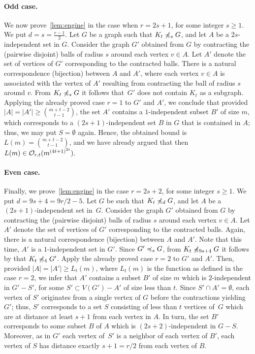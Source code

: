 \paragraph{Odd case.}
We now prove~\cref{lem:engine} in the case when $r=2s+1$, for some integer $s\geq 1$. We put $d=s=\frac{r-1}{2}$.
Let $G$ be a graph such that $K_t\not\preccurlyeq_s G$, and 
 let $A$ be a $2s$-independent set in $G$. Consider the graph $G'$ obtained from $G$
by contracting the (pairwise disjoint) balls of radius $s$ around each vertex $v\in A$.
 Let $A'$ denote the set of vertices of $G'$ corresponding to the contracted balls. There is a natural correspondence (bijection) between $A$ and $A'$, where each vertex $v\in A$ is associated with the
 vertex of $A'$ resulting from contracting the ball of radius $s$ around $v$.
From $K_t\not\preccurlyeq_s G$ it follows that~$G'$ does not contain $K_t$ as a subgraph. Applying the already proved case $r=1$ to $G'$ and $A'$, we conclude that 
provided $|A|=|A'|\ge {m+t-2\choose t-1}$, the set
 $A'$ contains a $1$-independent subset $B'$ of size $m$,
 which corresponds to a $(2s+1)$-independent set $B$ in $G$ that is contained in $A$; thus, we may put $S=\emptyset$ again.
 Hence, the obtained bound is $L(m)={m+t-2\choose t-1}$, and we have already argued that then $L(m)\in \mathcal{O}_{r,t}{(m^{{(4t+1)}^{2t}})}$.
 
 
 \paragraph{Even case.}
 Finally,
 we prove~\cref{lem:engine} in the case $r=2s+2$, for some integer $s\geq 1$. We put $d=9s+4=9r/2-5$.
Let $G$  be such that 
 $K_t\not\preccurlyeq_{d} G$, and
let $A$ be a $(2s+1)$-independent set in~$G$. Consider the graph $G'$ obtained from $G$
by contracting the (pairwise disjoint) balls of radius $s$ around each vertex $v\in A$.
 Let $A'$ denote the set of vertices of $G'$ corresponding to the contracted balls. Again, there is a natural correspondence (bijection) between $A$ and $A'$. Note that
this time, $A'$ is a $1$-independent set in $G'$.
Since $G'\preccurlyeq_s G$, from $K_t\not\preccurlyeq_{9s+4} G$ it follows by  that $K_t\not\preccurlyeq_4 G'$. Apply the already proved case $r=2$ to $G'$ and $A'$. 
Then, provided $|A|=|A'|\ge L_t(m)$, where $L_t(m)$ is the function as defined in the case $r=2$, we infer that
 $A'$ contains a subset $B'$ of size $m$
which is  $2$-independent in $G'-S'$, for some $S'\subset V(G')-A'$ of size less than $t$.
Since $S'\cap A'=\emptyset$, each vertex of $S'$ originates from a single vertex of $G$ before the contractions yielding $G'$; thus, $S'$ corresponds to a
set $S$ consisting of less than $t$ vertices of~$G$ which are at distance at least $s+1$ from each vertex in $A$.
In turn, the set $B'$ corresponds to some subset $B$ of $A$
which is $(2s+2)$-independent in $G-S$. Moreover, as in $G'$ each vertex of~$S'$
is a neighbor of each vertex of $B'$,  each vertex of $S$
has distance exactly $s+1=r/2$ from each vertex of $B$.

